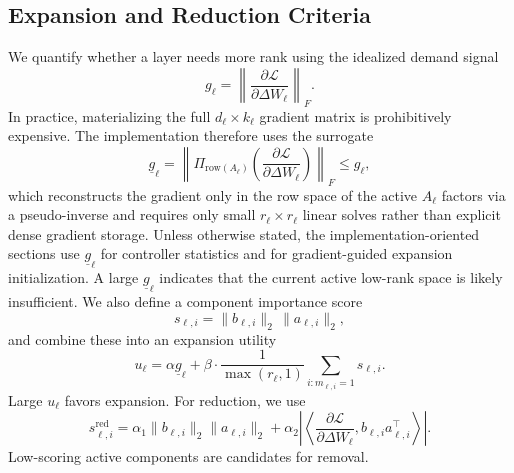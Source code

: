 \documentclass{article}
\begin{document}
\subsection{Expansion and Reduction Criteria}
We quantify whether a layer needs more rank using the idealized demand signal
\begin{equation}
    g_\ell = \left\|\frac{\partial \mathcal{L}}{\partial \Delta W_\ell}\right\|_F.
\end{equation}
In practice, materializing the full $d_\ell \times k_\ell$ gradient matrix is prohibitively expensive. The implementation therefore uses the surrogate
\begin{equation}
    \underline{g}_\ell
    =
    \left\|
    \Pi_{\mathrm{row}(A_\ell)}
    \left(
    \frac{\partial \mathcal{L}}{\partial \Delta W_\ell}
    \right)
    \right\|_F
    \le g_\ell,
\end{equation}
which reconstructs the gradient only in the row space of the active $A_\ell$ factors via a pseudo-inverse and requires only small $r_\ell \times r_\ell$ linear solves rather than explicit dense gradient storage. Unless otherwise stated, the implementation-oriented sections use $\underline{g}_\ell$ for controller statistics and for gradient-guided expansion initialization. A large $\underline{g}_\ell$ indicates that the current active low-rank space is likely insufficient. We also define a component importance score
\begin{equation}
    s_{\ell,i} = \|b_{\ell,i}\|_2\,\|a_{\ell,i}\|_2,
\end{equation}
and combine these into an expansion utility
\begin{equation}
    u_\ell = \alpha \underline{g}_\ell + \beta \cdot \frac{1}{\max(r_\ell,1)}\sum_{i:m_{\ell,i}=1} s_{\ell,i}.
\end{equation}
Large $u_\ell$ favors expansion. For reduction, we use
\begin{equation}
    s^{\mathrm{red}}_{\ell,i} = \alpha_1\|b_{\ell,i}\|_2\|a_{\ell,i}\|_2 + \alpha_2\left|\left\langle \frac{\partial \mathcal{L}}{\partial \Delta W_\ell}, b_{\ell,i}a_{\ell,i}^{\top}\right\rangle\right|.
\end{equation}
Low-scoring active components are candidates for removal.
\end{document}
